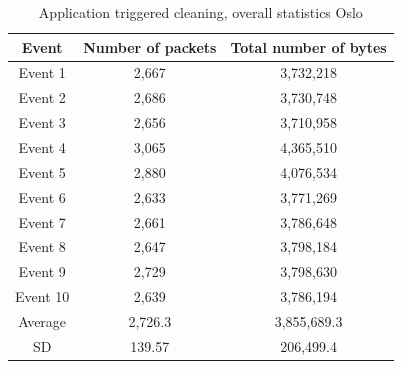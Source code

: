 \begin{table}[H]
\centering
\caption{Application triggered cleaning, overall statistics Oslo}
\label{tab:TCoverallOSL}
\begin{tabular}{|c|c|c|}
\hline
\textbf{Event} & \textbf{Number of packets} & \textbf{Total number of bytes} \\ \hline
Event 1        & 2,667                   & 3,732,218                   \\ \hline
Event 2        & 2,686                   & 3,730,748                   \\ \hline
Event 3        & 2,656                   & 3,710,958                   \\ \hline
Event 4        & 3,065                   & 4,365,510                   \\ \hline
Event 5        & 2,880                   & 4,076,534                   \\ \hline
Event 6        & 2,633                   & 3,771,269                   \\ \hline
Event 7        & 2,661                   & 3,786,648                   \\ \hline
Event 8        & 2,647                   & 3,798,184                   \\ \hline
Event 9        & 2,729                   & 3,798,630                   \\ \hline
Event 10       & 2,639                   & 3,786,194                   \\ \hline
Average        & 2,726.3                 & 3,855,689.3                 \\ \hline
SD        & 139.57
       & 206,499.4               \\ \hline
\end{tabular}
\end{table}

